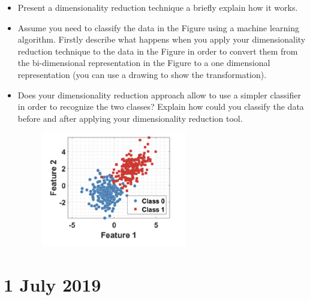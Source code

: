 \documentclass[a4paper,11pt,oneside]{book}
\begin{document}
\begin{itemize}
\item Present a dimensionality reduction technique a briefly explain how it works.

\item Assume you need to classify the data in the Figure using a machine learning algorithm. Firstly describe what happens when you apply your dimensionality reduction technique to the data in the Figure in order to convert them from the bi-dimensional representation in the Figure to a one dimensional representation (you can use a drawing to show the transformation).

\item Does your dimensionality reduction approach allow to use a simpler classifier in order to recognize the two classes? Explain how could you classify the data before and after applying your dimensionality reduction tool.

\begin{figure}[H]
   \centering
   \includegraphics[width=0.6\textwidth,height=0.4\textheight,keepaspectratio]{images/4_4_Sept_2019.png}
\end{figure}
\end{itemize}


\chapter{1 July 2019}
\end{document}
